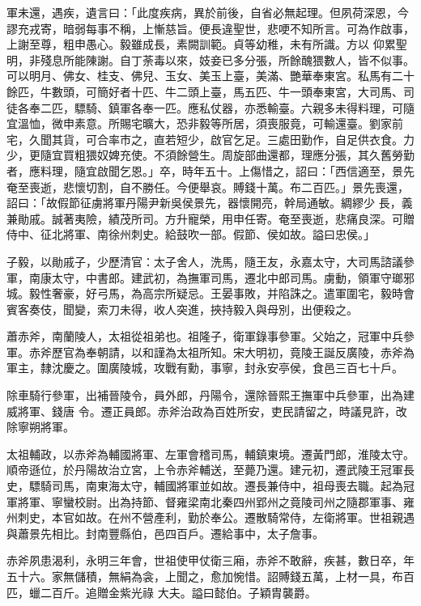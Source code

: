 \begin{pinyinscope}
 軍未還，遇疾，遺言曰：「此度疾病，異於前後，自省必無起理。但夙荷深恩，今謬充戎寄，暗弱每事不稱，上慚慈旨。便長違聖世，悲哽不知所言。可為作啟事，上謝至尊，粗申愚心。毅雖成長，素闕訓範。貞等幼稚，未有所識。方以
 仰累聖明，非殘息所能陳謝。自丁荼毒以來，妓妾已多分張，所餘醜猥數人，皆不似事。可以明月、佛女、桂支、佛兒、玉女、美玉上臺，美滿、艷華奉東宮。私馬有二十餘匹，牛數頭，可簡好者十匹、牛二頭上臺，馬五匹、牛一頭奉東宮，大司馬、司徒各奉二匹，驃騎、鎮軍各奉一匹。應私仗器，亦悉輸臺。六親多未得料理，可隨宜溫恤，微申素意。所賜宅曠大，恐非毅等所居，須喪服竟，可輸還臺。劉家前宅，久聞其貨，可合率市之，直若短少，啟官乞足。三處田勤作，自足供衣食。力少，更隨宜買粗猥奴婢充使。不須餘營生。周旋部曲還都，理應分張，其久舊勞勤者，應料理，隨宜啟聞乞恩。」卒，時年五十。上傷惜之，詔曰：「西信適至，景先奄至喪逝，悲懷切割，自不勝任。今便舉哀。賻錢十萬。布二百匹。」景先喪還，詔曰：「故假節征虜將軍丹陽尹新吳侯景先，器懷開亮，幹局通敏。綢繆少
 長，義兼勛戚。誠著夷險，績茂所司。方升寵榮，用申任寄。奄至喪逝，悲痛良深。可贈侍中、征北將軍、南徐州刺史。給鼓吹一部。假節、侯如故。謚曰忠侯。」



 子毅，以勛戚子，少歷清官：太子舍人，洗馬，隨王友，永嘉太守，大司馬諮議參軍，南康太守，中書郎。建武初，為撫軍司馬，遷北中郎司馬。虜動，領軍守瑯邪城。毅性奢豪，好弓馬，為高宗所疑忌。王晏事敗，并陷誅之。遣軍圍宅，毅時會賓客奏伎，聞變，索刀未得，收人突進，挾持毅入與母別，出便殺之。



 蕭赤斧，南蘭陵人，太祖從祖弟也。祖隆子，衛軍錄事參軍。父始之，冠軍中兵參軍。赤斧歷官為奉朝請，以和謹為太祖所知。宋大明初，竟陵王誕反廣陵，赤斧為軍主，隸沈慶之。圍廣陵城，攻戰有勳，事寧，封永安亭侯，食邑三百七十戶。



 除車騎行參軍，出補晉陵令，員外郎，丹陽令，還除晉熙王撫軍中兵參軍，出為建威將軍、錢唐
 令。遷正員郎。赤斧治政為百姓所安，吏民請留之，時議見許，改除寧朔將軍。



 太祖輔政，以赤斧為輔國將軍、左軍會稽司馬，輔鎮東境。遷黃門郎，淮陵太守。順帝遜位，於丹陽故治立宮，上令赤斧輔送，至薨乃還。建元初，遷武陵王冠軍長史，驃騎司馬，南東海太守，輔國將軍並如故。遷長兼侍中，祖母喪去職。起為冠軍將軍、寧蠻校尉。出為持節、督雍梁南北秦四州郢州之竟陵司州之隨郡軍事、雍州刺史，本官如故。在州不營產利，勤於奉公。遷散騎常侍，左衛將軍。世祖親遇與蕭景先相比。封南豐縣伯，邑四百戶。遷給事中，太子詹事。



 赤斧夙患渴利，永明三年會，世祖使甲仗衛三廂，赤斧不敢辭，疾甚，數日卒，年五十六。家無儲積，無絹為衾，上聞之，愈加惋惜。詔賻錢五萬，上材一具，布百匹，蠟二百斤。追贈金紫光祿
 大夫。謚曰懿伯。子穎胄襲爵。




\end{pinyinscope}
